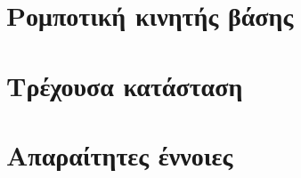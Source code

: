 \section{Ρομποτική κινητής βάσης}
  

\section{Τρέχουσα κατάσταση}
  

\section{Απαραίτητες έννοιες}
  
